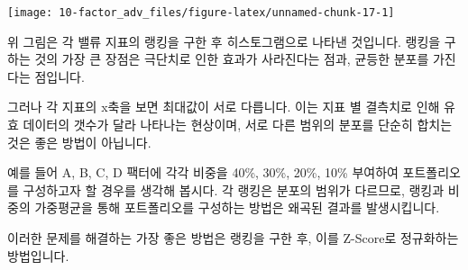 \documentclass[12pt,]{book}
\newenvironment{Shaded}{\begin{snugshade}}{\end{snugshade}}
\newcommand{\DataTypeTok}[1]{\textcolor[rgb]{0.13,0.29,0.53}{#1}}
\newcommand{\KeywordTok}[1]{\textcolor[rgb]{0.13,0.29,0.53}{\textbf{#1}}}
\newcommand{\NormalTok}[1]{#1}
\newcommand{\OperatorTok}[1]{\textcolor[rgb]{0.81,0.36,0.00}{\textbf{#1}}}
\newcommand{\StringTok}[1]{\textcolor[rgb]{0.31,0.60,0.02}{#1}}
\begin{document}
\begin{Shaded}
\end{Shaded}

\begin{center}\texttt{[image: 10-factor\_adv\_files/figure-latex/unnamed-chunk-17-1]} \end{center}

위 그림은 각 밸류 지표의 랭킹을 구한 후 히스토그램으로 나타낸 것입니다. 랭킹을 구하는 것의 가장 큰 장점은 극단치로 인한 효과가 사라진다는 점과, 균등한 분포를 가진다는 점입니다.

그러나 각 지표의 x축을 보면 최대값이 서로 다릅니다. 이는 지표 별 결측치로 인해 유효 데이터의 갯수가 달라 나타나는 현상이며, 서로 다른 범위의 분포를 단순히 합치는 것은 좋은 방법이 아닙니다.

예를 들어 A, B, C, D 팩터에 각각 비중을 40\%, 30\%, 20\%, 10\% 부여하여 포트폴리오를 구성하고자 할 경우를 생각해 봅시다. 각 랭킹은 분포의 범위가 다르므로, 랭킹과 비중의 가중평균을 통해 포트폴리오를 구성하는 방법은 왜곡된 결과를 발생시킵니다.

이러한 문제를 해결하는 가장 좋은 방법은 랭킹을 구한 후, 이를 Z-Score로 정규화하는 방법입니다.

\begin{Shaded}
\end{Shaded}
\end{document}
